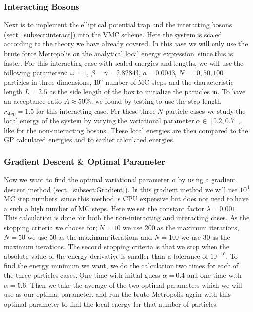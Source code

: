 \documentclass[12pt,a4paper,english]{article}
\begin{document}
\subsubsection{Interacting Bosons}
\label{subsubsect:Coding_int}
Next is to implement the elliptical potential trap and the interacting bosons (sect. \ref{subsect:interact}) into the VMC scheme. Here the system is scaled according to the theory we have already covered. In this case we will only use the brute force Metropolis on the analytical local energy expression, since this is faster. For this interacting case with scaled energies and lengths, we will use the following parameters: $\omega=1$, $\beta=\gamma=2.82843$, $a=0.0043$, $N=10,50,100$ particles in three dimensions, $10^5$ number of MC steps and the characteristic length $L=2.5$ as the side length of the box to initialize the particles in. To have an acceptance ratio $A\approx 50$\%, we found by testing to use the step length $r_{\text{step}}=1.5$ for this interacting case. For these three $N$ particle cases we study the local energy of the system by varying the variational parameter $\alpha\in[0.2,0.7]$, like for the non-interacting bosons. These local energies are then compared to the GP calculated energies and to earlier calculated energies.

\subsubsection{Gradient Descent \& Optimal Parameter}
\label{subsubsect:Coding_gradient}
Now we want to find the optimal variational parameter $\alpha$ by using a gradient descent method (sect. \ref{subsect:Gradient}). In this gradient method we will use $10^4$ MC step numbers, since this method is CPU expensive but does not need to have a such a high number of MC steps. Here we set the constant factor $\lambda=0.001$. This calculation is done for both the non-interacting and interacting cases. As the stopping criteria we choose for; $N=10$ we use 200 as the maximum iterations, $N=50$ we use 50 as the maximum iterations and $N=100$ we use 30 as the maximum iterations. The second stopping criteria is that we stop when the absolute value of the energy derivative is smaller than a tolerance of $10^{-10}$. To find the energy minimum we want, we do the calculation two times for each of the three particles cases. One time with initial guess $\alpha=0.4$ and one time with $\alpha=0.6$. Then we take the average of the two optimal parameters which we will use as our optimal parameter, and run the brute Metropolis again with this optimal parameter to find the local energy for that number of particles.
\end{document}
